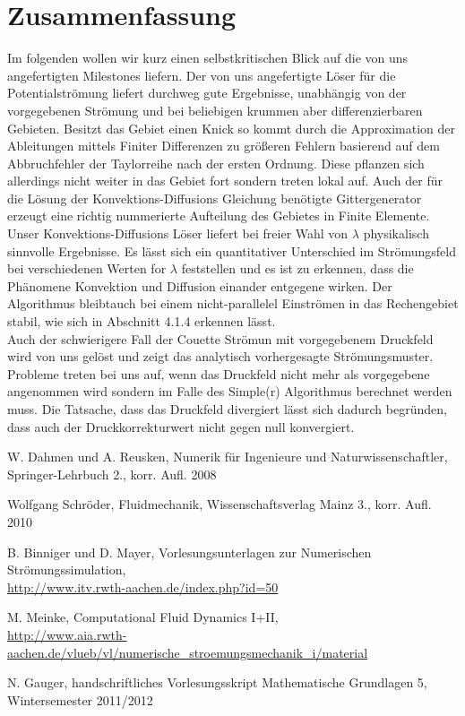 \documentclass{article}
\begin{document}
\section{Zusammenfassung}
Im folgenden wollen wir kurz einen selbstkritischen Blick auf die von uns angefertigten Milestones liefern.
Der von uns angefertigte Löser für die Potentialströmung liefert durchweg gute Ergebnisse, unabhängig von der vorgegebenen Strömung
und bei beliebigen krummen aber differenzierbaren Gebieten. Besitzt das Gebiet einen Knick so kommt durch die Approximation der
Ableitungen mittels Finiter Differenzen zu größeren Fehlern basierend auf dem Abbruchfehler der Taylorreihe nach der ersten Ordnung.
Diese pflanzen sich allerdings nicht weiter in das Gebiet fort sondern treten lokal auf. Auch der für die Lösung der Konvektions-Diffusions
Gleichung benötigte Gittergenerator erzeugt eine richtig nummerierte Aufteilung des Gebietes in Finite Elemente.
Unser Konvektions-Diffusions Löser liefert bei freier Wahl von $\lambda$ physikalisch sinnvolle Ergebnisse. Es lässt sich
ein quantitativer Unterschied im Strömungsfeld bei verschiedenen Werten for $\lambda$ feststellen und es ist zu erkennen,
dass die Phänomene Konvektion und Diffusion einander entgegene wirken. Der Algorithmus bleibtauch bei einem nicht-parallelel Einströmen 
in das Rechengebiet stabil, wie sich in Abschnitt 4.1.4 erkennen lässt.\\
Auch der schwierigere Fall der Couette Strömun mit vorgegebenem Druckfeld wird von uns gelöst und zeigt das analytisch vorhergesagte
Strömungsmuster.\\
Probleme treten bei uns auf, wenn das Druckfeld nicht mehr als vorgegebene angenommen wird sondern im Falle des Simple(r) Algorithmus
berechnet werden muss. Die Tatsache, dass das Druckfeld divergiert lässt sich dadurch begründen, dass auch der Druckkorrekturwert nicht 
gegen null konvergiert.


\begin{thebibliography}{9}

 W. Dahmen und A. Reusken, Numerik
 für Ingenieure und Naturwissenschaftler, Springer-Lehrbuch 2., korr. Aufl. 2008

Wolfgang Schröder, Fluidmechanik, Wissenschaftsverlag Mainz 3., korr. Aufl. 2010

 B. Binniger und D. Mayer, Vorlesungsunterlagen zur Numerischen Strömungssimulation,\\
\url{http://www.itv.rwth-aachen.de/index.php?id=50}

 M. Meinke, Computational Fluid Dynamics I+II,\\
\url{http://www.aia.rwth-aachen.de/vlueb/vl/numerische_stroemungsmechanik_i/material}

 N. Gauger, handschriftliches Vorlesungsskript Mathematische Grundlagen 5, Wintersemester 2011/2012



\end{thebibliography}
\end{document}
